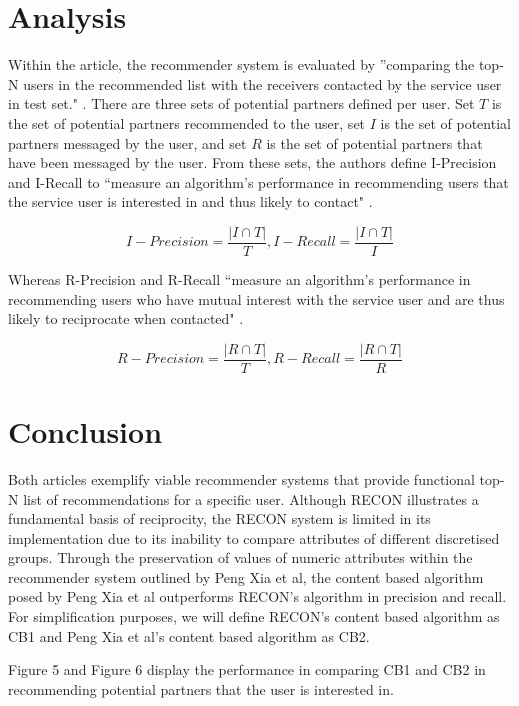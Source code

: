 \documentclass[11pt]{article}
\begin{document}
\section{Analysis}
Within the article, the recommender system is evaluated by ''comparing the top-N users
in the recommended list with the receivers contacted by the service user in test set." \cite{recip}. There are three sets of potential partners defined per user.
Set $T$ is the set of potential partners recommended to the user, set $I$ is the set of potential partners messaged by the user, and set $R$ is the set of potential partners that have been messaged by the user. From these sets, the authors define I-Precision and I-Recall to ``measure an algorithm’s performance in recommending users that the service user is interested in and thus likely to contact" \cite{recip}.  

\begin{equation}
    I-Precision = \frac{\lvert I \cap T\rvert}{T}, I-Recall = \frac{\lvert I \cap T\rvert}{I}
\end{equation}

Whereas R-Precision and R-Recall ``measure an algorithm’s performance in recommending users who have mutual interest with the service user and are thus likely to reciprocate when contacted" \cite{recip}.

\begin{equation}
    R-Precision = \frac{\lvert R \cap T\rvert}{T}, R-Recall = \frac{\lvert R \cap T\rvert}{R}
\end{equation}

\section{Conclusion}
Both articles exemplify viable recommender systems that provide functional top-N list of recommendations for a specific user. Although RECON illustrates a fundamental basis of reciprocity, the RECON system is limited in its implementation due to its inability to compare attributes of different discretised groups. Through the preservation of values of numeric attributes within the recommender system outlined by Peng Xia et al, the content based algorithm posed by Peng Xia et al outperforms RECON's algorithm in precision and recall. For simplification purposes, we will define RECON's content based algorithm as CB1 and Peng Xia et al's content based algorithm as CB2.

Figure 5 and Figure 6 display the performance in comparing CB1 and CB2 in recommending potential partners that the user is interested in. 
\end{document}
